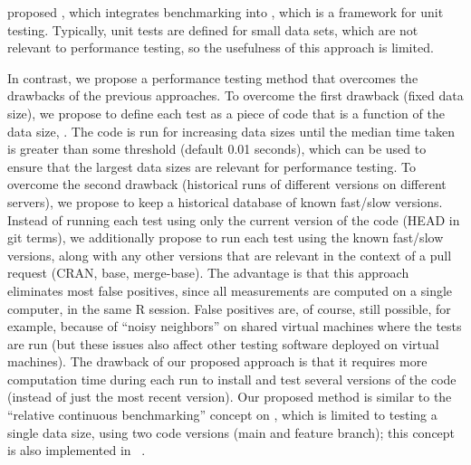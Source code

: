 \citet{pytest_benchmark} proposed , which integrates  benchmarking into , which is a framework for unit testing.
Typically, unit tests are defined for small data sets, which are not relevant to performance testing, so the usefulness of this approach is limited.

In contrast, we propose a performance testing method that overcomes the drawbacks of the previous approaches.
To overcome the first drawback (fixed data size), we propose to define each test as a piece of code that is a function of the data size, . 
The code is run for increasing data sizes until the median time taken is greater than some threshold (default 0.01 seconds), which can be used to ensure that the largest data sizes are relevant for performance testing.
To overcome the second drawback (historical runs of different versions on different servers), we propose to keep a historical database of known fast/slow versions.
Instead of running each test using only the current version of the code (HEAD in git terms), we additionally propose to run each test using the known fast/slow versions, along with any other versions that are relevant in the context of a pull request (CRAN, base, merge-base).
The advantage is that this approach eliminates most false positives, since all measurements are computed on a single computer, in the same R session.
False positives are, of course, still possible, for example, because of ``noisy neighbors'' on shared virtual machines where the tests are run (but these issues also affect other testing software deployed on virtual machines).
The drawback of our proposed approach is that it requires more computation time during each run to install and test several versions of the code (instead of just the most recent version).
Our proposed method is similar to the ``relative continuous benchmarking'' concept on  \citep{bencher}, which is limited to testing a single data size, using two code versions (main and feature branch); this concept is also implemented in 
~\citep{touchstone}.

